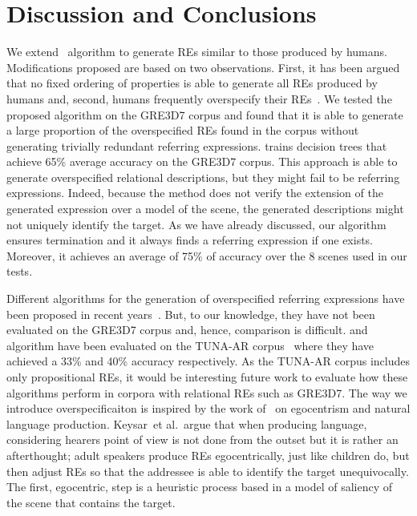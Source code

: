 \section{Discussion and Conclusions} \label{sec:discussion}

We extend~ algorithm to generate REs similar to those produced by humans. Modifications 
proposed are based on two observations. First, it has been argued that no fixed ordering of properties is able to generate all REs produced by humans and, second, humans frequently overspecify their REs~\cite{Engelhardt_Bailey_Ferreira_2006,Arts_Maes_Noordman_Jansen_2011,viet:gene11}. We tested 
the proposed algorithm on the GRE3D7 corpus and found that it is able to generate a large proportion of the overspecified REs found in the corpus without generating trivially redundant referring expressions.
%
 trains decision trees that achieve 65\% average accuracy on the GRE3D7 corpus. 
This approach is able to generate overspecified relational descriptions, but they might fail to be referring 
expressions. Indeed, because the  method does not verify the extension of the generated expression over a model of the scene, the 
generated descriptions might not uniquely identify the target.  As we have already discussed,
our algorithm ensures termination and it always finds a referring expression if one exists.  Moreover, it achieves an average of 75\% of accuracy over the 8 scenes used in our tests. 

Different algorithms for the generation of overspecified referring expressions have been proposed in recent years~\cite{delucena-paraboni:2008:ENLG,ruud-emiel-mariet:2012:INLG2012}.  But, to our knowledge, they have not been evaluated on the 
GRE3D7 corpus and, hence, comparison is difficult.  and  algorithm
have been evaluated on the TUNA-AR corpus~\cite{gatt-balz-kow:2008:ENLG} where they have achieved a 33\% and 40\% accuracy respectively. 
As the TUNA-AR corpus includes only propositional REs, it would be interesting future work to evaluate how these algorithms perform in corpora with relational REs such as GRE3D7. The way we introduce overspecificaiton is inspired by the work of~ on egocentrism and natural language production.  Keysar~et al.\ argue that when producing language, considering hearers point of view is not done from the outset but it is rather an afterthought; adult speakers produce REs egocentrically, just like children do, but then adjust REs so that the addressee is able to identify the target unequivocally. The first, egocentric, step is a heuristic process based in a model of saliency of the scene that contains the target. 

